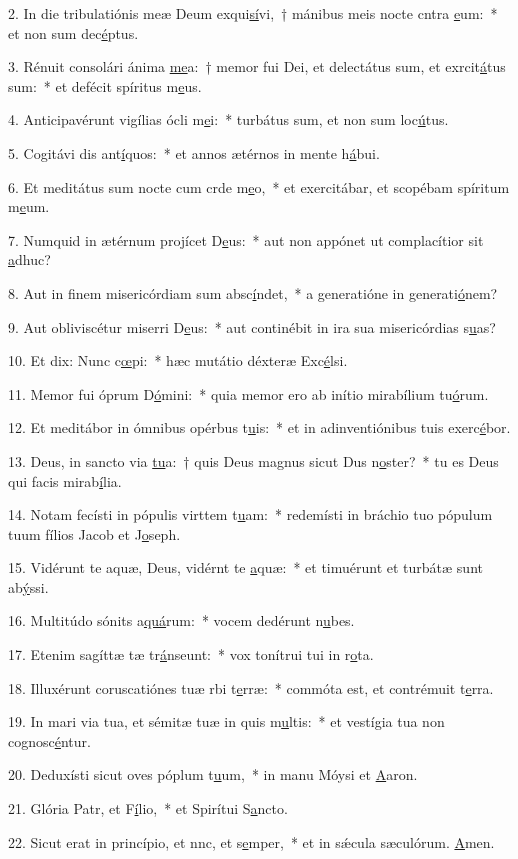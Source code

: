 2. In die tribulatiónis meæ Deum exqui\uline{sí}vi,~† mánibus meis nocte cntra \uline{e}um:~* et non sum dec\uline{é}ptus.\par 
3. Rénuit consolári ánima \uline{me}a:~† memor fui Dei, et delectátus sum, et exrcit\uline{á}tus sum:~* et defécit spíritus m\uline{e}us.\par 
4. Anticipavérunt vigílias ócli m\uline{e}i:~* turbátus sum, et non sum loc\uline{ú}tus.\par 
5. Cogitávi dis ant\uline{í}quos:~* et annos ætérnos in mente h\uline{á}bui.\par 
6. Et meditátus sum nocte cum crde m\uline{e}o,~* et exercitábar, et scopébam spíritum m\uline{e}um.\par 
7. Numquid in ætérnum projícet D\uline{e}us:~* aut non appónet ut complacítior sit \uline{a}dhuc?\par 
8. Aut in finem misericórdiam sum absc\uline{í}ndet,~* a generatióne in generati\uline{ó}nem?\par 
9. Aut obliviscétur miserri D\uline{e}us:~* aut continébit in ira sua misericórdias s\uline{u}as?\par 
10. Et dix: Nunc c\uline{œ}pi:~* hæc mutátio déxteræ Exc\uline{é}lsi.\par 
11. Memor fui óprum D\uline{ó}mini:~* quia memor ero ab inítio mirabílium tu\uline{ó}rum.\par 
12. Et meditábor in ómnibus opérbus t\uline{u}is:~* et in adinventiónibus tuis exerc\uline{é}bor.\par 
13. Deus, in sancto via \uline{tu}a:~† quis Deus magnus sicut Dus n\uline{o}ster?~* tu es Deus qui facis mirab\uline{í}lia.\par 
14. Notam fecísti in pópulis virttem t\uline{u}am:~* redemísti in bráchio tuo pópulum tuum fílios Jacob et J\uline{o}seph.\par 
15. Vidérunt te aquæ, Deus, vidérnt te \uline{a}quæ:~* et timuérunt et turbátæ sunt ab\uline{ý}ssi.\par 
16. Multitúdo sónits a\uline{quá}rum:~* vocem dedérunt n\uline{u}bes.\par 
17. Etenim sagíttæ tæ tr\uline{á}nseunt:~* vox tonítrui tui in r\uline{o}ta.\par 
18. Illuxérunt coruscatiónes tuæ rbi t\uline{e}rræ:~* commóta est, et contrémuit t\uline{e}rra.\par 
19. In mari via tua, et sémitæ tuæ in quis m\uline{u}ltis:~* et vestígia tua non cognosc\uline{é}ntur.\par 
20. Deduxísti sicut oves póplum t\uline{u}um,~* in manu Móysi et \uline{A}aron.\par 
21. Glória Patr, et F\uline{í}lio,~* et Spirítui S\uline{a}ncto.\par 
22. Sicut erat in princípio, et nnc, et s\uline{e}mper,~* et in sǽcula sæculórum. \uline{A}men.\par 

